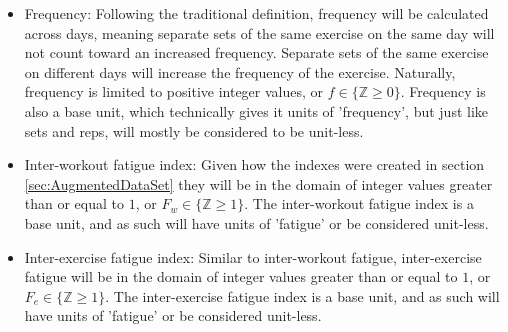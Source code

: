 \begin{itemize}
	\item Frequency: Following the traditional definition, frequency will be calculated across days, meaning separate sets of the same exercise on the same day will not count toward an increased frequency. Separate sets of the same exercise on different days will increase the frequency of the exercise. Naturally, frequency is limited to positive integer values, or $f\in \{ \mathbb{Z}\ge 0 \}$. Frequency is also a base unit, which technically gives it units of 'frequency', but just like sets and reps, will mostly be considered to be unit-less.
	
	\item Inter-workout fatigue index: Given how the indexes were created in section \ref{sec:AugmentedDataSet} they will be in the domain of integer values greater than or equal to $1$, or $F_w\in \{ \mathbb{Z} \ge 1 \}$. The inter-workout fatigue index is a base unit, and as such will have units of 'fatigue' or be considered unit-less.
	
	\item Inter-exercise fatigue index: Similar to inter-workout fatigue, inter-exercise fatigue will be in the domain of integer values greater than or equal to $1$, or $F_e\in \{ \mathbb{Z} \ge 1 \}$. The inter-exercise fatigue index is a base unit, and as such will have units of 'fatigue' or be considered unit-less.
\end{itemize}



